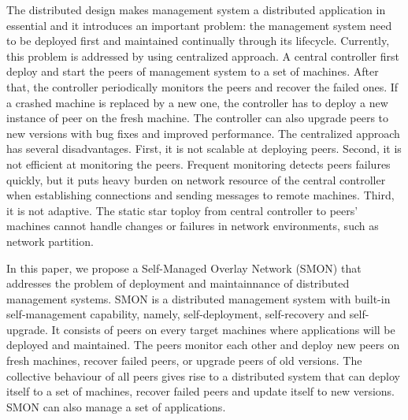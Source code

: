 The distributed design makes management system a distributed
application in essential and it introduces an important
problem: the management system need to be deployed first and
maintained continually through its lifecycle. Currently,
this problem is addressed by using centralized approach. A
central controller first deploy and start the peers of
management system to a set of machines. After that, the
controller periodically monitors the peers and recover the
failed ones. If a crashed machine is replaced by a new one,
the controller has to deploy a new instance of peer on the
fresh machine. The controller can also upgrade peers to new
versions with bug fixes and improved performance. The
centralized approach has several disadvantages. First, it is
not scalable at deploying peers. Second, it is not efficient
at monitoring the peers. Frequent monitoring detects peers
failures quickly, but it puts heavy burden on network
resource of the central controller when establishing
connections and sending messages to remote machines. Third,
it is not adaptive. The static star toploy from central
controller to peers' machines cannot handle changes or
failures in network environments, such as network partition.

In this paper, we propose a Self-Managed Overlay Network
(SMON) that addresses the problem of deployment and
maintainnance of distributed management systems. SMON is a
distributed management system with built-in self-management
capability, namely, self-deployment, self-recovery and
self-upgrade. It consists of peers on every target machines
where applications will be deployed and maintained. The
peers monitor each other and deploy new peers on fresh
machines, recover failed peers, or upgrade peers of old
versions. The collective behaviour of all peers gives rise
to a distributed system that can deploy itself to a set of
machines, recover failed peers and update itself to new
versions. SMON can also manage a set of applications.



